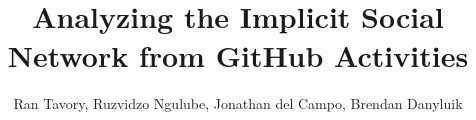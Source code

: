 \documentclass[sigconf,11pt]{acmart}
\begin{document}
\title{\Large Analyzing the Implicit Social Network from GitHub Activities}

\author{\normalsize Ran Tavory, Ruzvidzo Ngulube, Jonathan del Campo, Brendan Danyluik}









\end{document}
